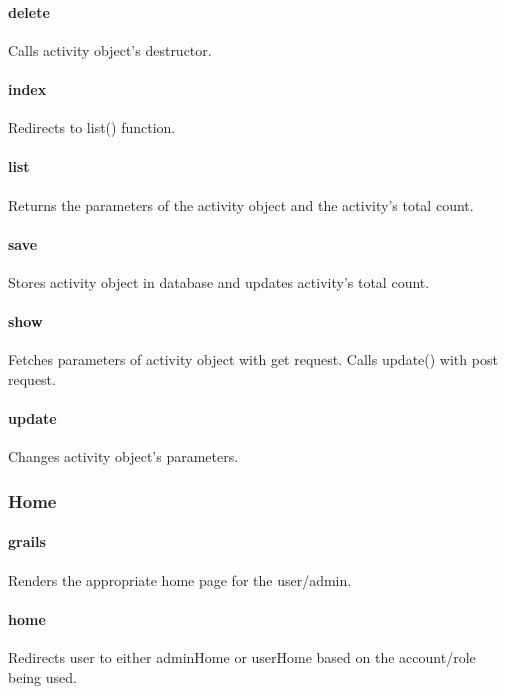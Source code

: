 \documentclass[12pt]{article}
\begin{document}
\paragraph{delete} Calls activity object's destructor.
\paragraph{index} Redirects to list() function.
\paragraph{list} Returns the parameters of the activity object and the activity's total count.
\paragraph{save} Stores activity object in database and updates activity's total count.
\paragraph{show} Fetches parameters of activity object with get request. Calls update() with post request.
\paragraph{update} Changes activity object's parameters.

\subsubsection{Home}\label{sec:CHome}
\paragraph{grails} Renders the appropriate home page for the user/admin.
\paragraph{home} Redirects user to either adminHome or userHome based on the account/role being used.
\end{document}
